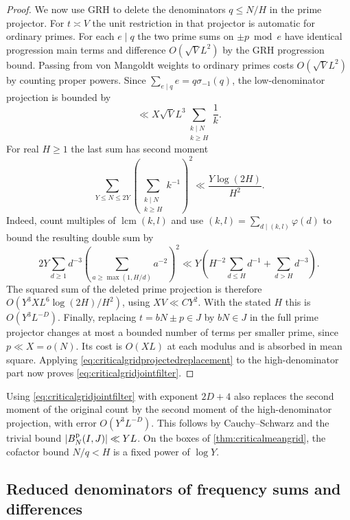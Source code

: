 \documentclass[11pt,a4paper]{article}
\numberwithin{equation}{section}
\begin{document}
\begin{proof}
We now use GRH to delete the denominators
$q\le N/H$ in the prime projector. For
$t\asymp V$ the unit restriction in that
projector is automatic for ordinary primes.
For each $e\mid q$ the two prime sums on
$\pm p\bmod e$ have identical progression
main terms and difference $O(\sqrt V L^2)$
by the GRH progression bound. Passing from
von Mangoldt weights to ordinary primes costs
$O(\sqrt V L^2)$ by counting proper powers.
Since $\sum_{e\mid q}e=q\sigma_{-1}(q)$,
the low-denominator projection is bounded by
\[
 \ll X\sqrt V L^3
          \sum_{\substack{k\mid N\\k\ge H}}\frac1k .
\]
For real $H\ge1$ the last sum has second moment
\begin{equation}
 \sum_{Y\le N\le2Y}
     \left(\sum_{\substack{k\mid N\\k\ge H}}k^{-1}\right)^2
   \ll \frac{Y\log(2H)}{H^2}.
 \label{eq:criticalgridaddivisortail}
\end{equation}
Indeed, count multiples of $\operatorname{lcm}(k,l)$
and use $(k,l)=\sum_{d\mid(k,l)}\varphi(d)$ to bound
the resulting double sum by
\[
 2Y\sum_{d\ge1}d^{-3}
      \left(\sum_{a\ge\max(1,H/d)}a^{-2}\right)^2
 \ll Y\left(H^{-2}\sum_{d\le H}d^{-1}
                       +\sum_{d>H}d^{-3}\right).
\]
The squared sum of the deleted prime projection is
therefore $O(Y^3X L^6\log(2H)/H^2)$, using $XV\ll CY^2$.
With the stated $H$ this is $O(Y^3 L^{-D})$.
Finally, replacing $t=bN\pm p\in J$ by $bN\in J$
in the full prime projector changes at most a
bounded number of terms per smaller prime, since
$p\ll X=o(N)$. Its cost is $O(XL)$ at each modulus
and is absorbed in mean square. Applying
\cref{eq:criticalgridprojectedreplacement} to the
high-denominator part now proves
\cref{eq:criticalgridjointfilter}.
\end{proof}

Using \cref{eq:criticalgridjointfilter} with exponent
$2D+4$ also replaces the second moment of the original
count by the second moment of the high-denominator
projection, with error $O(Y^3L^{-D})$. This follows
by Cauchy--Schwarz and the trivial bound
$|B_N^{\rm p}(I,J)|\ll YL$. On the boxes of
\cref{thm:criticalmeangrid}, the cofactor bound
$N/q<H$ is a fixed power of $\log Y$.

\clearpage
\subsection{Reduced denominators of frequency sums and differences}
\end{document}
